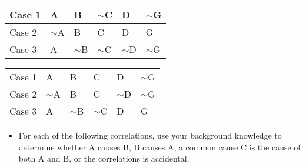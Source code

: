 \begin{table}[htp]
\begin{tabular}{|l|l|l|l|l|l|}
\hline
Case 1 & A       & B       & $\sim$C & D       & $\sim$G \\
\hline
Case 2 & $\sim$A & B       & C       & D       & G       \\
\hline
Case 3 & A       & $\sim$B & $\sim$C & $\sim$D & $\sim$G \\
\hline
\end{tabular}
\end{table}

\begin{table}[htp]
\begin{tabular}{|l|l|l|l|l|l|}
\hline
Case 1 & A       & B       & C       & D       & $\sim$G \\
Case 2 & $\sim$A & B       & C       & $\sim$D & $\sim$G \\
Case 3 & A       & $\sim$B & $\sim$C & D       & G      \\
\hline
\end{tabular}
\end{table}

\newpage
\begin{itemize}
\item For each of the following correlations, use your background
knowledge to determine whether A causes B, B causes A, a common
cause C is the cause of both A and B, or the correlations is accidental.
\end{itemize}

